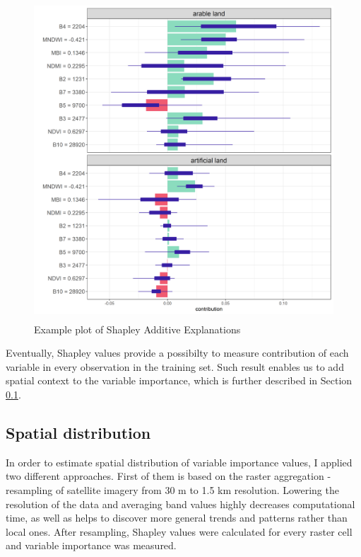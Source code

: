 \documentclass{amuthesis}
\begin{document}
\begin{figure}[H]

{\centering \includegraphics[width=4.54167in,height=4.6875in]{./figures/shapley_values.png}

}

\caption{\label{fig-rycina8}Example plot of Shapley Additive
Explanations}

\end{figure}

Eventually, Shapley values provide a possibilty to measure contribution
of each variable in every observation in the training set. Such result
enables us to add spatial context to the variable importance, which is
further described in Section \ref{sec-importance-distribution}.

\hypertarget{sec-importance-distribution}{%
\subsection{Spatial distribution}\label{sec-importance-distribution}}

In order to estimate spatial distribution of variable importance values,
I applied two different approaches. First of them is based on the raster
aggregation - resampling of satellite imagery from 30 m to 1.5 km
resolution. Lowering the resolution of the data and averaging band
values highly decreases computational time, as well as helps to discover
more general trends and patterns rather than local ones. After
resampling, Shapley values were calculated for every raster cell and
variable importance was measured.
\end{document}
